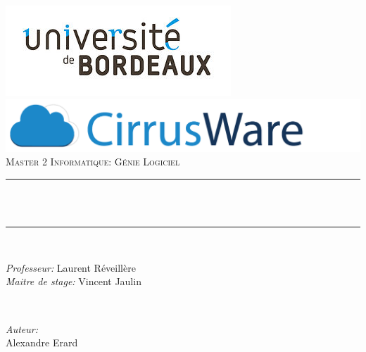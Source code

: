 \begin{titlepage}
	\centering
    \vspace*{0.5 cm}
    \includegraphics[scale = 0.6]{assets/logo_ub.jpg}	%
    \includegraphics[scale = 0.25]{assets/logo_cirrusware.png}\\[1.0 cm]	%
	\textsc{\Large Master 2 Informatique: Génie Logiciel}\\[0.5 cm]				%
	\rule{\linewidth}{0.2 mm} \\[0.4 cm]
	{ \huge \bfseries \thetitle}\\
	\rule{\linewidth}{0.2 mm} \\[1.5 cm]
	
	\begin{minipage}{0.5\textwidth}
		\begin{flushleft} \large
			\emph{Professeur:}
			Laurent Réveillère\\
			\emph{Maitre de stage:}
            Vincent Jaulin\\
			\end{flushleft}
			\end{minipage}~
			\begin{minipage}{0.4\textwidth}
            
			\begin{flushright} \large
                \emph{Auteur:}\\
			Alexandre Erard\\
		\end{flushright}
        
	\end{minipage}\\[2 cm]
	
	
    \thedate
\end{titlepage}

